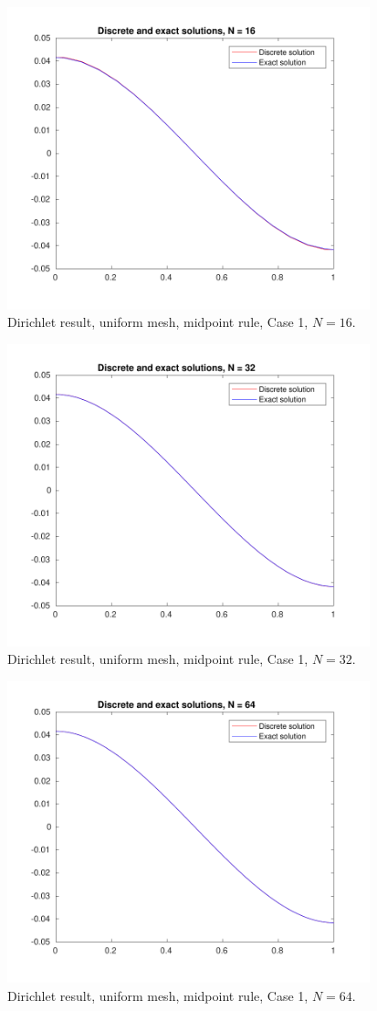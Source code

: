 \documentclass[a4paper]{article}
\numberwithin{equation}{section}
\begin{document}
\begin{figure}[H]
\centering\includegraphics[width=10.5cm]{fig_dirichlet_result_uniform_midpoint_N16_C1}
\caption{Dirichlet result, uniform mesh, midpoint rule, Case 1, $N=16$.}
\end{figure}
\begin{figure}[H]
\centering\includegraphics[width=10.5cm]{fig_dirichlet_result_uniform_midpoint_N32_C1}
\caption{Dirichlet result, uniform mesh, midpoint rule, Case 1, $N=32$.}
\end{figure}
\begin{figure}[H]
\centering\includegraphics[width=10.5cm]{fig_dirichlet_result_uniform_midpoint_N64_C1}
\caption{Dirichlet result, uniform mesh, midpoint rule, Case 1, $N=64$.}
\end{figure}
\end{document}
